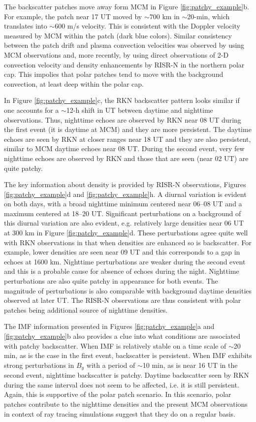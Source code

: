 The backscatter patches move away form MCM in Figure \ref{fig:patchy_example}b.  For example, the patch near 17 UT moved by \(\sim700\) km in \(\sim\)20-min, which translates into \(\sim600\) m/s velocity.  This is consistent with the Doppler velocity measured by MCM within the patch (dark blue colors).  Similar consistency between the patch drift and plasma convection velocities was observed by \citet{Bristow2011} using MCM observations and, more recently, by \citet{Makarevich2015} using direct observations of 2-D convection velocity and density enhancements by RISR-N in the northern polar cap.  This impolies that polar patches tend to move with the background convection, at least deep within the polar cap.

In Figure \ref{fig:patchy_example}c, the RKN backscatter pattern looks similar if one accounts for a \(\sim\)12-h  shift in UT between daytime and nighttime observations. Thus, nighttime echoes are observed by RKN near 08 UT during the first event (it is daytime at MCM) and they are more persistent. The daytime echoes are seen by RKN at closer ranges near 18 UT and they are also persistent, similar to MCM daytime echoes near 08 UT. During the second event, very few nighttime echoes are observed by RKN and those that are seen (near 02 UT) are quite patchy.

The key information about density is provided by RISR-N observations, Figures \ref{fig:patchy_example}d and \ref{fig:patchy_example}h. A diurnal variation is evident on both days, with a broad nighttime minimum centered near 06--08 UT and a maximum centered at 18--20 UT. Significant perturbations on a background of this diurnal variation are also evident, e.g. relatively large densities near 06 UT at 300 km in Figure \ref{fig:patchy_example}d. These perturbations agree quite well with RKN observations in that when densities are enhanced so is backscatter. For example, lower densities are seen near 09 UT and this corresponds to a gap in echoes at 1600 km. Nighttime perturbations are weaker during the second event and this is a probable cause for absence of echoes during the night. Nighttime perturbations are also quite patchy in appearance for both events. The magnitude of perturbations is also comparable with background daytime densities observed at later UT. The RISR-N observations are thus consistent with polar patches being additional source of nighttime densities.

The IMF information presented in Figures \ref{fig:patchy_example}a and \ref{fig:patchy_example}b also provides a clue into what conditions are associated with patchy backscatter. When IMF is relatively stable on a time scale of \(\sim\)20 min, as is the case in the first event, backscatter is persistent. When IMF exhibits strong perturbations in \(B_y\) with a period of \(\sim\)10 min, as is near 16 UT in the second event, nighttime backscatter is patchy. Daytime backscatter seen by RKN during the same interval does not seem to be affected, i.e. it is still persistent. Again, this is supportive of the polar patch scenario.  In this scenario, polar patches contribute to the nighttime densities and the present MCM observations in context of ray tracing simulations suggest that they do on a regular basis.



